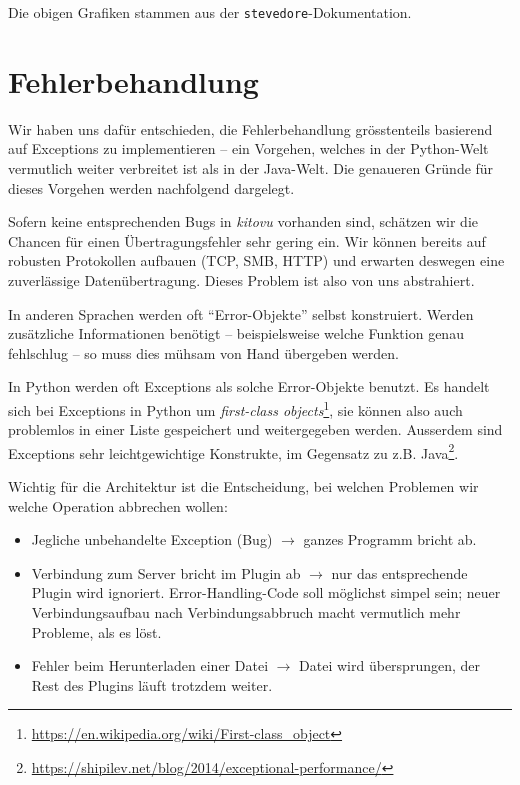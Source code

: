 \documentclass[a4paper]{article}
\let\oldsection\section
\renewcommand\section{\clearpage\oldsection}
\begin{document}
Die obigen Grafiken stammen aus der \verb|stevedore|-Dokumentation.

\section{Fehlerbehandlung}
Wir haben uns dafür entschieden, die Fehlerbehandlung grösstenteils basierend
auf Exceptions zu implementieren -- ein Vorgehen, welches in der Python-Welt
vermutlich weiter verbreitet ist als in der Java-Welt. Die genaueren Gründe für
dieses Vorgehen werden nachfolgend dargelegt.

Sofern keine entsprechenden Bugs in \emph{kitovu} vorhanden sind, schätzen wir die
Chancen für einen Übertragungsfehler sehr gering ein. Wir können bereits auf robusten Protokollen aufbauen
(TCP, SMB, HTTP) und erwarten deswegen eine zuverlässige Datenübertragung. Dieses Problem ist also von uns abstrahiert.

In anderen Sprachen werden oft ``Error-Objekte'' selbst konstruiert. Werden
zusätzliche Informationen benötigt -- beispielsweise welche Funktion genau fehlschlug -- so muss dies mühsam von Hand übergeben werden.

In Python werden oft Exceptions als solche Error-Objekte benutzt. Es handelt
sich bei Exceptions in Python um \emph{first-class
  objects}\footnote{\url{https://en.wikipedia.org/wiki/First-class_object}}, sie
können also auch problemlos in einer Liste gespeichert und weitergegeben werden.
Ausserdem sind Exceptions sehr leichtgewichtige Konstrukte, im Gegensatz zu z.B.
Java\footnote{\url{https://shipilev.net/blog/2014/exceptional-performance/}}.

Wichtig für die Architektur ist die Entscheidung, bei welchen Problemen wir
welche Operation abbrechen wollen:

\begin{itemize}
  \item Jegliche unbehandelte Exception (Bug) $\rightarrow$ ganzes Programm bricht ab.
  \item Verbindung zum Server bricht im Plugin ab $\rightarrow$ nur das
    entsprechende Plugin wird ignoriert. Error-Handling-Code soll möglichst
    simpel sein; neuer Verbindungsaufbau nach Verbindungsabbruch macht
    vermutlich mehr Probleme, als es löst.
  \item Fehler beim Herunterladen einer Datei $\rightarrow$ Datei wird
    übersprungen, der Rest des Plugins läuft trotzdem weiter.
\end{itemize}
\end{document}
